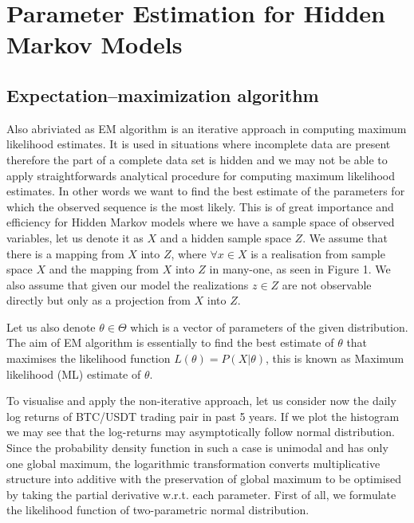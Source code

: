 
\chapter{Parameter Estimation for Hidden Markov Models}

\ifpdf
    \graphicspath{{Chapter2/Figs/Raster/}{Chapter2/Figs/PDF/}{Chapter2/Figs/}}
\else
    \graphicspath{{Chapter2/Figs/Vector/}{Chapter2/Figs/}}
\fi



\section{ Expectation–maximization algorithm}

Also abriviated as EM algorithm is an iterative approach in computing maximum likelihood estimates. It is used in situations where incomplete data are present therefore the part of a complete data set is hidden and we may not be able to apply straightforwards analytical procedure for computing maximum likelihood estimates. In other words we want to find the best estimate of the parameters for which the observed sequence is the most likely. This is of great importance and efficiency for Hidden Markov models where we have a sample space of observed variables, let us denote it as $X$ and a hidden sample space $Z$. We assume that there is a mapping from $X$ into $Z$, where $\forall x \in X$ is a realisation from sample space $X$ and the mapping from $X$ into $Z$ in many-one, as seen in Figure 1. We also assume that given our model the realizations $z \in Z$ are not observable directly but only as a projection from $X$ into $Z$. 

Let us also denote $\theta \in \Theta$ which is a vector of parameters of the given distribution. The aim of EM algorithm is essentially to find the best estimate of $\theta$ that maximises the likelihood function $L(\theta) = P(X|\theta)$, this is known as Maximum likelihood (ML) estimate of $\theta$. 

To visualise and apply the non-iterative approach, let us consider now the daily log returns of BTC/USDT trading pair in past 5 years. If we plot the histogram we may see that the log-returns may asymptotically follow normal distribution. Since the probability density function in such a case is unimodal and has only one global maximum, the logarithmic transformation converts multiplicative structure into additive with the preservation of global maximum to be optimised by taking the partial derivative w.r.t. each parameter. First of all, we formulate the likelihood function of two-parametric normal distribution.
 
